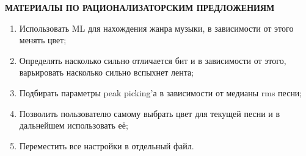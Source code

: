 \begin{center}
\bfseries{\large МАТЕРИАЛЫ ПО РАЦИОНАЛИЗАТОРСКИМ ПРЕДЛОЖЕНИЯМ}
\end{center}

\begin{enumerate}
    \item Использовать ML для нахождения жанра музыки, в зависимости от этого менять цвет;
    \item Определять насколько сильно отличается бит и в зависимости от этого, варьировать насколько сильно вспыхнет лента;
    \item Подбирать параметры peak picking'а в зависимости от медианы rms песни;
    \item Позволить пользователю самому выбрать цвет для текущей песни и в дальнейшем использовать её;
    \item Переместить все настройки в отдельный файл.
\end{enumerate}
\pagebreak
